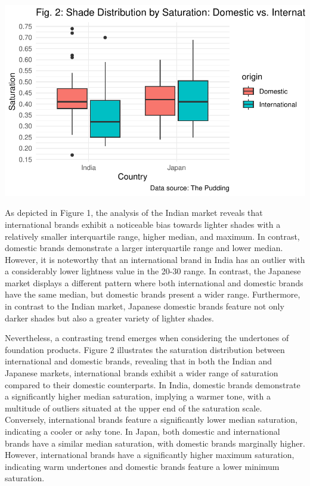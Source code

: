 \documentclass[
  letterpaper,
  DIV=11,
  numbers=noendperiod]{scrartcl}
\begin{document}
\includegraphics{paper_files/figure-pdf/unnamed-chunk-4-1.pdf}

As depicted in Figure 1, the analysis of the Indian market reveals that
international brands exhibit a noticeable bias towards lighter shades
with a relatively smaller interquartile range, higher median, and
maximum. In contrast, domestic brands demonstrate a larger interquartile
range and lower median. However, it is noteworthy that an international
brand in India has an outlier with a considerably lower lightness value
in the 20-30 range. In contrast, the Japanese market displays a
different pattern where both international and domestic brands have the
same median, but domestic brands present a wider range. Furthermore, in
contrast to the Indian market, Japanese domestic brands feature not only
darker shades but also a greater variety of lighter shades.

Nevertheless, a contrasting trend emerges when considering the
undertones of foundation products. Figure 2 illustrates the saturation
distribution between international and domestic brands, revealing that
in both the Indian and Japanese markets, international brands exhibit a
wider range of saturation compared to their domestic counterparts. In
India, domestic brands demonstrate a significantly higher median
saturation, implying a warmer tone, with a multitude of outliers
situated at the upper end of the saturation scale. Conversely,
international brands feature a significantly lower median saturation,
indicating a cooler or ashy tone. In Japan, both domestic and
international brands have a similar median saturation, with domestic
brands marginally higher. However, international brands have a
significantly higher maximum saturation, indicating warm undertones and
domestic brands feature a lower minimum saturation.
\end{document}
